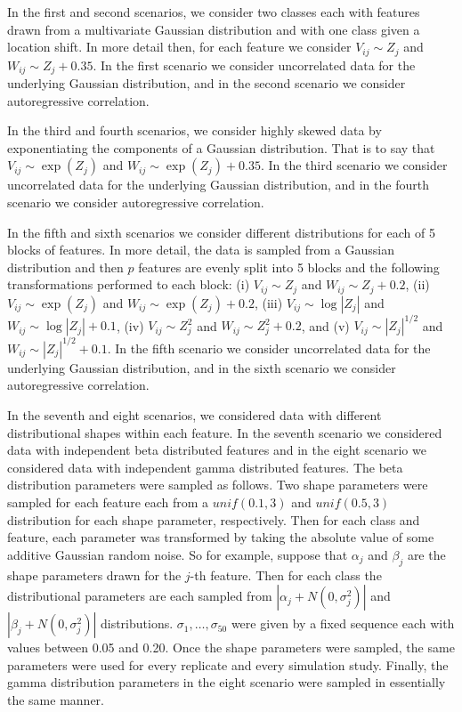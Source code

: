 In the first and second scenarios, we consider two classes each with features
drawn from a multivariate Gaussian distribution and with one class given a
location shift.  In more detail then, for each feature we consider
$V_{ij} \sim Z_j$ and $W_{ij} \sim Z_j + 0.35$.  In the first scenario we
consider uncorrelated data for the underlying Gaussian distribution, and in the
second scenario we consider autoregressive correlation.

In the third and fourth scenarios, we consider highly skewed data by
exponentiating the components of a Gaussian distribution.  That is to say that
$V_{ij} \sim \exp(Z_j)$ and $W_{ij} \sim \exp(Z_j) + 0.35$.  In the third
scenario we consider uncorrelated data for the underlying Gaussian distribution,
and in the fourth scenario we consider autoregressive correlation.

In the fifth and sixth scenarios we consider different distributions for each of
5 blocks of features.  In more detail, the data is sampled from a Gaussian
distribution and then $p$ features are evenly split into 5 blocks and the
following transformations performed to each block: (i) $V_{ij} \sim Z_j$ and
$W_{ij} \sim Z_j + 0.2$, (ii) $V_{ij} \sim \exp(Z_j)$ and
$W_{ij} \sim \exp(Z_j) + 0.2$, (iii) $V_{ij} \sim \log |Z_j|$ and
$W_{ij} \sim \log |Z_j| + 0.1$, (iv) $V_{ij} \sim Z_j^2$ and
$W_{ij} \sim Z_j^2 + 0.2$, and (v) $V_{ij} \sim |Z_j|^{1/2}$ and
$W_{ij} \sim |Z_j|^{1/2} + 0.1$.  In the fifth scenario we consider uncorrelated
data for the underlying Gaussian distribution, and in the sixth scenario we
consider autoregressive correlation.

In the seventh and eight scenarios, we considered data with different
distributional shapes within each feature.  In the seventh scenario we
considered data with independent beta distributed features and in the eight
scenario we considered data with independent gamma distributed features.  The
beta distribution parameters were sampled as follows.  Two shape parameters were
sampled for each feature each from a $\mathit{unif}(0.1, 3)$ and
$\mathit{unif}(0.5, 3)$ distribution for each shape parameter, respectively.
Then for each class and feature, each parameter was transformed by taking the
absolute value of some additive Gaussian random noise.  So for example, suppose
that $\alpha_j$ and $\beta_j$ are the shape parameters drawn for the $j$-th
feature.  Then for each class the distributional parameters are each sampled
from $|\alpha_j + N(0, \sigma_j^2)|$ and $|\beta_j + N(0, \sigma_j^2)|$
distributions.  $\sigma_1, \dots, \sigma_{50}$ were given by a fixed sequence
each with values between 0.05 and 0.20.  Once the shape parameters were sampled,
the same parameters were used for every replicate and every simulation study.
Finally, the gamma distribution parameters in the eight scenario were sampled in
essentially the same manner.



